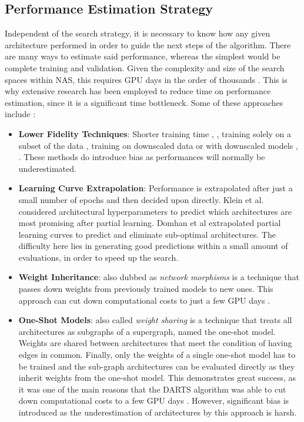 \documentclass[10pt,        %
               a4paper,     %
               journal,     %
               ]{IEEEtran}
\begin{document}
\subsection{Performance Estimation Strategy}
\label{PES}
Independent of the search strategy, it is necessary to know how any given architecture performed in order
to guide the next steps of the algorithm. There are many ways to estimate said performance, whereas the simplest
would be complete training and validation. Given the complexity and size of the search spaces within NAS, this
requires GPU days in the order of thousands \cite{elsken2019neural}. This is why extensive research has been
employed to reduce time on performance estimation, since it is a significant time bottleneck.
Some of these approaches include \cite{elsken2019neural}:
\begin{itemize}
    \item \textbf{Lower Fidelity Techniques}: Shorter training time \cite{zela2018towards}, \cite{zoph2018learning}, training solely on a
        subset of the data \cite{klein2018towards}, training on downscaled data \cite{chrabaszcz2017downsampled} or with downscaled
        models \cite{zoph2018learning}, \cite{pmlr-v70-real17a}. These methods do introduce bias as performances will normally be
        underestimated.

    \item \textbf{Learning Curve Extrapolation}: Performance is extrapolated after just a small number of epochs and then
        decided upon directly. Klein et al. \cite{klein2018towards} considered architectural hyperparameters to predict which
        architectures are most promising after partial learning. Domhan et al \cite{domhan2015speeding} extrapolated partial
        learning curves to predict and eliminate sub-optimal architectures. The difficulty here lies in generating good
        predictions within a small amount of evaluations, in order to speed up the search.

    \item \textbf{Weight Inheritance}: also dubbed as \textit{network morphisms} is a technique that passes down weights from
        previously trained models to new ones. This approach can cut down computational costs to just a few GPU days
        \cite{cai2018efficient}.

    \item \textbf{One-Shot Models}: also called \textit{weight sharing} is a technique that treats all architectures as subgraphs
        of a supergraph, named the one-shot model. Weights are shared between architectures that meet the condition of
        having edges in common. Finally, only the weights of a single one-shot model has to be trained and the
        sub-graph architectures can be evaluated directly as they inherit weights from the one-shot model. This demonstrates great
        success, as it was one of the main reasons that the DARTS algorithm was able to cut down computational costs
        to a few GPU days \cite{liu2018darts}. However, significant bias is introduced as the underestimation of
        architectures by this approach is harsh.
\end{itemize}
\end{document}
